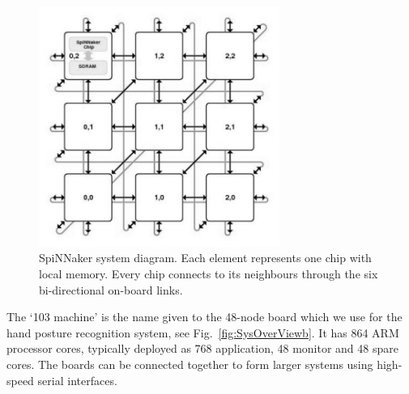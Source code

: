 \begin{figure}
\centering
	\includegraphics[width=0.7\textwidth]{pics_icann/mesh_ctiff.jpg}
	\caption{SpiNNaker system diagram.
	Each element represents one chip with local memory.
	Every chip connects to its neighbours through the six bi-directional on-board links. }
	\label{fig:sysdia}
\end{figure}

%

The `103 machine' is the name given to the 48-node board which we use for the hand posture recognition system, see Fig.~\ref{fig:SysOverViewb}.
It has 864 ARM processor cores, typically deployed as 768 application, 48 monitor and 48 spare cores. 
The boards can be connected together to form larger systems using high-speed serial interfaces. 

